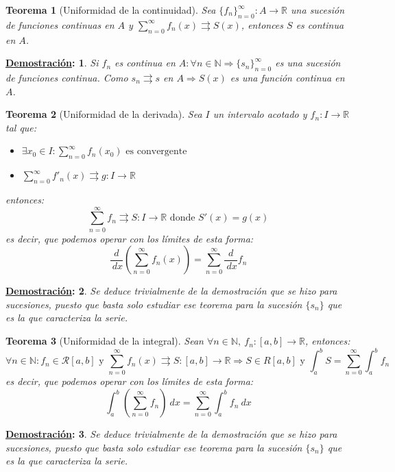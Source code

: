 \documentclass[10pt,a4paper,openright]{book}
\theoremstyle{break}
\newtheorem*{theo}{Teorema}
\newtheorem*{demo}{\underline{Demostración}:}
\newcommand{\dif}[1]{\ d#1}
\begin{document}
\begin{theo}[Uniformidad de la continuidad]
Sea $\{f_n\}_{n = 0}^\infty : A \rightarrow \mathbb{R}$ una sucesión de funciones continuas en $A$ y $\sum_{n=0}^{\infty} f_n (x) \rightrightarrows S(x)$, entonces $S$ es continua en $A$.
\end{theo}
\begin{demo}
Si $f_n$ es continua en $A : \forall n \in \mathbb N\Rightarrow \{s_n\}_{n = 0}^\infty$ es una sucesión de funciones continua. Como $s_n \rightrightarrows s$ en $A \Rightarrow S(x)$ es una función continua en $A$.
\end{demo}

\begin{theo}[Uniformidad de la derivada]
Sea $I$ un intervalo acotado y $f_n : I \to \mathbb{R}$ tal que:
\begin{itemize}
\item $\exists x_0 \in I :  \displaystyle\sum_{n = 0}^{\infty} f_n (x_0) \mbox{ es convergente }$
\item $\displaystyle \sum_{n = 0}^{\infty} f'_n (x) \rightrightarrows g:I \to \mathbb{R}$
\end{itemize}
entonces:
$$\sum_{n = 0}^{\infty} f_n \rightrightarrows S: I \to \mathbb{R} \mbox{  donde } S'(x) = g(x)$$
es decir, que podemos operar con los límites de esta forma:
$$\frac{d}{\dif{x}}\left( \sum_{n = 0}^{\infty} f_n (x) \right) = \sum_{n = 0}^{\infty} \frac{d}{\dif{x}} f_n$$
\end{theo}
\begin{demo}
Se deduce trivialmente de la demostración que se hizo para sucesiones, puesto que basta solo estudiar ese teorema para la sucesión $\{s_n\}$ que es la que caracteriza la serie.
\end{demo}

\begin{theo}[Uniformidad de la integral]
Sean $\forall n \in \mathbb{N}, \ f_n: [a,b]\rightarrow \mathbb{R}$, entonces:
$$\forall n \in \mathbb N: f_n \in \mathcal{R}[a,b] \mbox{ y } \sum_{n = 0}^{\infty} f_n (x)\rightrightarrows S:[a,b] \to \mathbb{R} \Rightarrow S\in R[a,b] \mbox{ y } \int_{a}^{b} S = \sum_{n=0}^{\infty} \int_{a}^{b} f_n$$
es decir, que podemos operar con los límites de esta forma:
$$
\int_{a}^{b} \left(\sum_{n = 0}^{\infty} f_n \right) \dif{x}= \sum_{n=0}^{\infty} \int_{a}^{b} f_n \dif{x}$$
\end{theo}
\begin{demo}
Se deduce trivialmente de la demostración que se hizo para sucesiones, puesto que basta solo estudiar ese teorema para la sucesión $\{s_n\}$ que es la que caracteriza la serie.
\end{demo}
\end{document}
